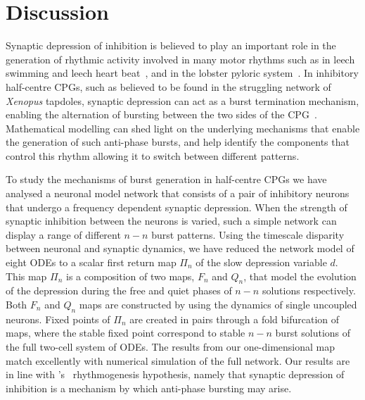 \section{Discussion}
Synaptic depression of inhibition is believed to play an important role in the generation of rhythmic activity involved in many motor rhythms such as in leech swimming \citep{mangan1994} and leech heart beat~\citep{calabrese1995}, and in the lobster pyloric system~\citep{manor1997, rabbah2007}. In inhibitory half-centre CPGs, such as believed to be found in the struggling network of \textit{Xenopus} tapdoles,  synaptic depression can act as a burst termination mechanism, enabling the alternation of bursting between the two sides of the CPG~\citep{li2007}. Mathematical modelling can shed light on the underlying mechanisms that enable the generation of such anti-phase bursts, and help identify the components that control this rhythm allowing it to switch between different patterns.

To study the mechanisms of burst generation in half-centre CPGs we have analysed a neuronal model network that consists of a pair of inhibitory neurons that undergo a frequency dependent synaptic depression. When the strength of synaptic inhibition between the neurons is varied, such a simple network can display a range of different $n-n$ burst patterns. Using the timescale disparity between neuronal and synaptic dynamics, we have reduced the network model of eight ODEs to a scalar first return map $\Pi_n$ of the slow depression variable $d$. This map $\Pi_n$ is a composition of two maps, $F_n$ and $Q_n$, that model the evolution of the depression during the free and quiet phases of $n-n$ solutions respectively. Both $F_n$ and $Q_n$ maps are constructed by using the dynamics of single uncoupled neurons. Fixed points of $\Pi_n$ are created in pairs through a fold bifurcation of maps, where the stable fixed point correspond to stable $n-n$ burst solutions of the full two-cell system of ODEs. The results from our one-dimensional map match excellently with numerical simulation of the full network. Our results are in line with \citeauthor{brown1911}'s~\citeyear{brown1911} rhythmogenesis hypothesis, namely that synaptic depression of inhibition is a mechanism by which anti-phase bursting may arise.

